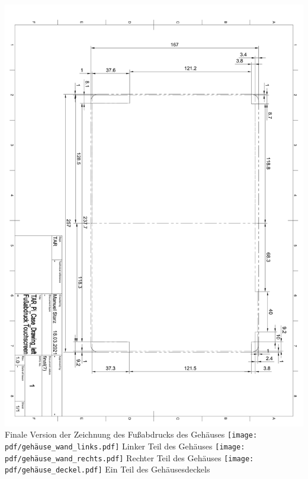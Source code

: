 \includegraphics*[width=1\textwidth,page=1]{pdf/gehäuse_zeichnung_fußabdruck_final.pdf}
\label{fig:case_footprint_final}
Finale Version der Zeichnung des Fußabdrucks des Gehäuses
\newpage
\texttt{[image: pdf/gehäuse\_wand\_links.pdf]}
Linker Teil des Gehäuses
\label{fig:case_left}
\newpage
\texttt{[image: pdf/gehäuse\_wand\_rechts.pdf]}
Rechter Teil des Gehäuses
\label{fig:case_right}
\newpage
\texttt{[image: pdf/gehäuse\_deckel.pdf]}
Ein Teil des Gehäusesdeckels
\label{fig:case_back}
\newpage